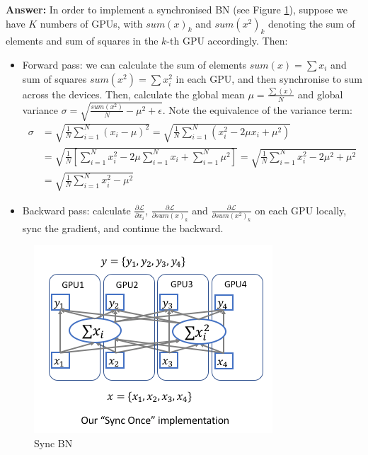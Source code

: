 \documentclass{article}
\newenvironment{QandA}{\begin{enumerate}[label=\arabic*.]}{\end{enumerate}}
\newenvironment{answer}{\par\normalfont \textbf{Answer:}}{}
\begin{document}
\begin{QandA}
\begin{answer}
        In order to implement a synchronised BN (see Figure \ref{fig:sync-bn}), suppose we have $K$ numbers of GPUs, with $sum(x)_k$ and $sum(x^2)_k$ denoting the sum of elements and sum of squares in the $k$-th GPU accordingly. Then:
        \begin{itemize}
            \item Forward pass: we can calculate the sum of elements $sum(x) = \sum{x_i}$ and sum of squares $sum(x^2) = \sum x_i^2$ in each GPU, and then synchronise to sum across the devices. Then, calculate the global mean $\mu = \frac{\sum(x)}{N}$ and global variance $\sigma = \sqrt{\frac{sum(x^2)}{N} - \mu^2 + \epsilon}$. Note the equivalence of the variance term:
            \begin{align*}
                \sigma &= \sqrt{\frac{1}{N} \sum_{i=1}^N \left(x_i - \mu \right)^2} 
                = \sqrt{\frac{1}{N} \sum_{i=1}^N \left( x_i^2 - 2\mu x_i + \mu^2  \right)} \\
                &= \sqrt{\frac{1}{N} \left[ \sum_{i=1}^N x_i^2 - 2 \mu \sum_{i=1}^N x_i + \sum_{i=1}^N \mu^2 \right]} 
                = \sqrt{\frac{1}{N} \sum_{i=1}^N x_i^2 - 2\mu^2 + \mu^2} \\
                &=  \sqrt{\frac{1}{N} \sum_{i=1}^N x_i^2 - \mu^2}
            \end{align*}

            \item Backward pass: calculate $\frac{\partial \mathcal{L}}{\partial x_i}$, $\frac{\partial \mathcal{L}}{\partial sum(x)_k}$ and $\frac{\partial \mathcal{L}}{\partial sum(x^2)_k}$ on each GPU locally, sync the gradient, and continue the backward. 
        \end{itemize}

        \begin{figure}[h!]
            \centering
            \includegraphics[width=0.7\linewidth]{img/sync-bn.png}
            \caption{Sync BN\footnotemark}
            \label{fig:sync-bn}
        \end{figure}
        

\end{answer}
\end{QandA}
\end{document}
